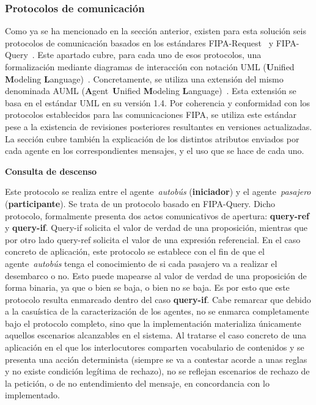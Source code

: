 \subsubsection{Protocolos de comunicación}\label{subsubsec:comms_protocols}
Como ya se ha mencionado en la sección anterior, existen para esta solución seis protocolos de comunicación basados en los estándares
FIPA-Request~\cite{fipa2002request} y FIPA-Query~\cite{fipa2002query}. Este apartado cubre, para cada uno de esos protocolos, una
formalización mediante diagramas de interacción con notación UML (\textbf{U}nified \textbf{M}odeling \textbf{L}anguage)~\cite{omg2001uml14}. 
Concretamente, se utiliza una extensión del mismo denominada AUML (\textbf{A}gent~\textbf{U}nified \textbf{M}odeling \textbf{L}anguage)~\cite{odell2001auml}. Esta extensión se basa en el estándar UML en su versión 1.4. Por coherencia  y conformidad con los protocolos 
establecidos para las comunicaciones FIPA, se utiliza este estándar pese a la existencia de revisiones posteriores resultantes en 
versiones actualizadas. La sección cubre también la explicación de los distintos atributos enviados por cada
agente en los correspondientes mensajes, y el uso que se hace de cada uno. 

\medskip
\noindent\textbf{Consulta de descenso}

Este protocolo se realiza entre el agente~\textit{autobús} (\textbf{iniciador}) y el agente~\textit{pasajero} (\textbf{participante}). 
Se trata de un protocolo basado en FIPA-Query. Dicho protocolo, formalmente presenta dos actos comunicativos de apertura:
\textbf{query-ref} y \textbf{query-if}.
Query-if solicita el valor de verdad de una proposición, mientras que por otro lado query-ref solicita el valor de una expresión referencial.
En el caso concreto de aplicación, este protocolo se establece con el fin de que el agente~\textit{autobús} tenga el conocimiento de si cada
pasajero va a realizar el desembarco o no. Esto puede mapearse al valor de verdad de una proposición de forma binaria, ya que o bien se baja,
o bien no se baja. Es por esto que este protocolo resulta enmarcado dentro del caso \textbf{query-if}. Cabe remarcar que debido a la
casuística de la caracterización de los agentes, no se enmarca completamente bajo el protocolo completo, sino que la implementación 
materializa únicamente aquellos escenarios alcanzables en el sistema. Al tratarse el caso concreto de una aplicación en el que los interlocutores
comparten vocabulario de contenidos y se presenta una acción determinista (siempre se va a contestar acorde a unas reglas y no existe condición
legítima de rechazo), no se reflejan escenarios de rechazo de la petición, o de no entendimiento del mensaje, en concordancia con lo 
implementado. 

